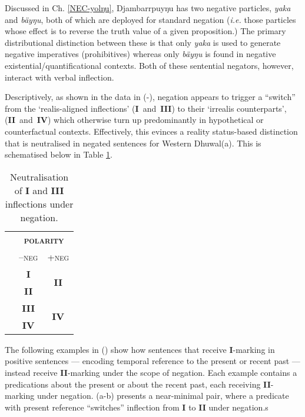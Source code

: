 Discussed in Ch. \ref{NEC-yolŋu}, Djambarrpuyŋu has two negative particles, \textit{yaka} and \textit{bäyŋu}, both of which are deployed for standard negation (\textit{i.e.} those particles whose effect is to reverse the truth value of a given proposition.) The primary distributional distinction between these is that only \textit{yaka} is used to generate negative imperatives (prohibitives) whereas only \textit{bäyŋu} is found in negative existential/quantificational contexts. Both of these sentential negators, however, interact with verbal inflection.


Descriptively, as shown in the data in (-), negation appears to trigger a ``switch'' from the `realis-aligned inflections' (\textbf{I}~and~\textbf{III}) to their `irrealis counterparts', (\textbf{II}~and~\textbf{IV}) which otherwise turn up predominantly in hypothetical or counterfactual contexts. Effectively, this evinces a reality status-based distinction that is neutralised in negated sentences \citep[see also][356]{Wilkinson1991} for Western Dhuwal(a). This is schematised below in Table \ref{negneut}.

\begin{table}[h]\centering
	\begin{tabular}{ccc}
		&\multicolumn{2}{c}{\textsc{\textbf{polarity}}} \\
		& \textsc{--neg} & \textsc{+neg}\\\midrule
		&	\textbf{I} & \multirow{2}{*}{\textbf{II}}\\
		& \textbf{II} \\\midrule
		&	\textbf{III} & \multirow{2}{*}{\textbf{IV}}\\
		& \textbf{IV} \\\bottomrule
	\end{tabular}
	\caption{Neutralisation of \textbf{I} and \textbf{III} inflections under negation.}\label{negneut}
\end{table}


The following examples in () show how sentences that receive \textbf{I}-marking in positive sentences --- encoding temporal reference to the present or recent past --- instead receive \textbf{II}-marking under the scope of negation. Each example contains a predications about the present or about the recent past, each receiving \textbf{II}-marking under negation. (a-b) presents a near-minimal pair, where a predicate with present reference ``switches'' inflection from \textbf{I} to \textbf{II} under negation.s

